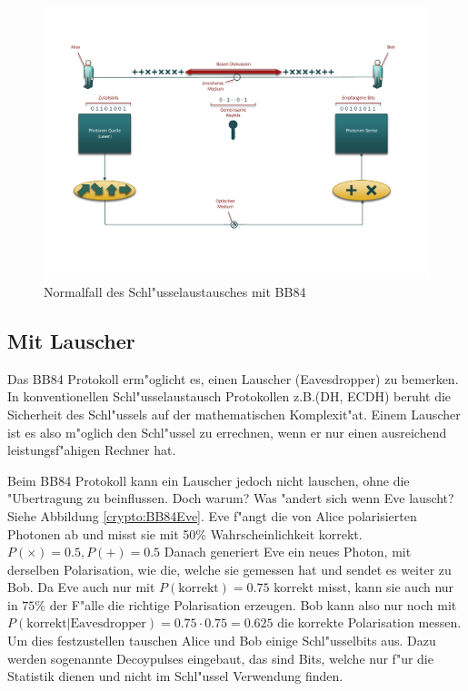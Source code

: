   \begin{figure}
    \centering
    \includegraphics[height=0.45\textheight]{crypto/BB84.pdf}
    \caption{Normalfall des Schl"usselaustausches mit BB84\label{crypto:BB84KE}}
  \end{figure}

  \subsection{Mit Lauscher}
  Das BB84 Protokoll erm"oglicht es, einen Lauscher (Eavesdropper) zu bemerken.
  In konventionellen Schl"usselaustausch Protokollen z.B.(DH, ECDH)
  beruht die Sicherheit des Schl"ussels auf der mathematischen Komplexit"at.
  Einem Lauscher ist es also m"oglich den Schl"ussel zu errechnen,
  wenn er nur einen ausreichend leistungsf"ahigen Rechner hat.

  Beim BB84 Protokoll kann ein Lauscher jedoch nicht lauschen, ohne die "Ubertragung zu beinflussen.
  Doch warum? Was "andert sich wenn Eve lauscht? Siehe Abbildung \ref{crypto:BB84Eve}.
  Eve f"angt die von Alice polarisierten Photonen ab und misst sie mit 50\% Wahrscheinlichkeit korrekt.
  $P(\times)=0.5, P(+)=0.5$
  Danach generiert Eve ein neues Photon, mit derselben Polarisation,
  wie die, welche sie gemessen hat und sendet es weiter zu Bob.
  Da Eve auch nur mit
  $P(\text{korrekt})=0.75$
  korrekt misst, kann sie auch nur in
  $75\%$
  der F"alle die richtige Polarisation erzeugen.
  Bob kann also nur noch mit
  $P(\text{korrekt}|\text{Eavesdropper})=0.75\cdot 0.75=0.625$
  die korrekte Polarisation messen.
  Um dies festzustellen tauschen Alice und Bob einige Schl"usselbits aus.
  Dazu werden sogenannte Decoypulses eingebaut, das sind Bits,
  welche nur f"ur die Statistik dienen und nicht im Schl"ussel Verwendung finden.

